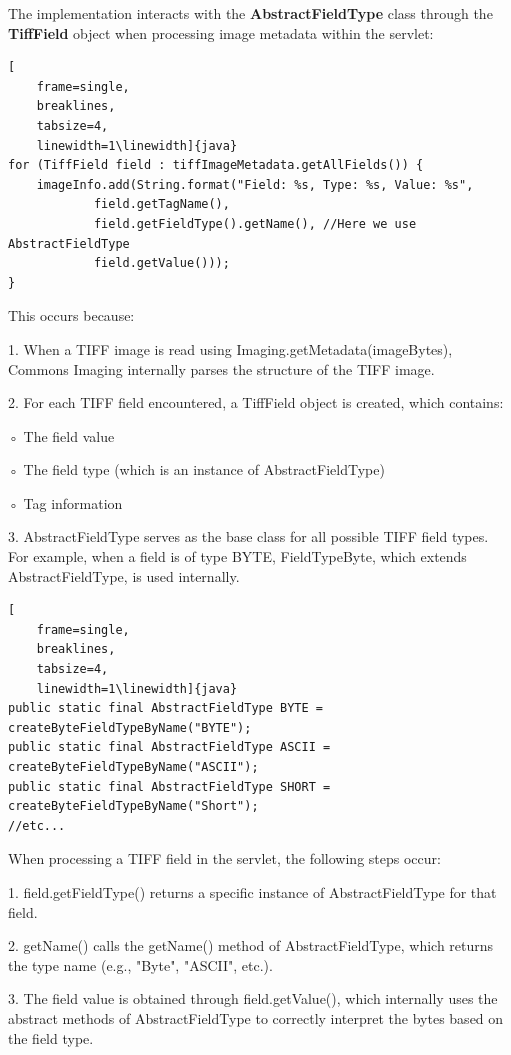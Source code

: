 \documentclass[sigconf]{acmart}
\begin{document}
The implementation interacts with the \textbf{AbstractFieldType} class through the \textbf{TiffField} object when processing image metadata within the servlet:

\begin{lstlisting}[
    frame=single,
    breaklines,
    tabsize=4,
    linewidth=1\linewidth]{java}
for (TiffField field : tiffImageMetadata.getAllFields()) {
    imageInfo.add(String.format("Field: %s, Type: %s, Value: %s",
            field.getTagName(), 
            field.getFieldType().getName(), //Here we use AbstractFieldType
            field.getValue()));
}
\end{lstlisting}

This occurs because:

1. When a TIFF image is read using Imaging.getMetadata(imageBytes), Commons Imaging internally parses the structure of the TIFF image.

2. For each TIFF field encountered, a TiffField object is created, which contains:

◦ The field value

◦ The field type (which is an instance of AbstractFieldType)

◦ Tag information

3. AbstractFieldType serves as the base class for all possible TIFF field types. For example, when a field is of type BYTE, FieldTypeByte, which extends AbstractFieldType, is used internally.


\begin{lstlisting}[
    frame=single,
    breaklines,
    tabsize=4,
    linewidth=1\linewidth]{java}
public static final AbstractFieldType BYTE = createByteFieldTypeByName("BYTE");
public static final AbstractFieldType ASCII = createByteFieldTypeByName("ASCII");
public static final AbstractFieldType SHORT = createByteFieldTypeByName("Short");
//etc...
\end{lstlisting}

When processing a TIFF field in the servlet, the following steps occur:

    1. field.getFieldType() returns a specific instance of AbstractFieldType for that field.
    
    2. getName() calls the getName() method of AbstractFieldType, which returns the type name (e.g., "Byte", "ASCII", etc.).
    
    3. The field value is obtained through field.getValue(), which internally uses the abstract methods of AbstractFieldType to correctly interpret the bytes based on the field type.
    
\end{document}
